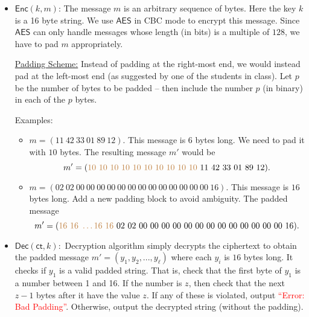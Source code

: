 \documentclass[11pt]{article}
\newcommand{\AES}{\mathsf{AES}}
\newcommand{\enc}{\mathsf{Enc}}
\newcommand{\dec}{\mathsf{Dec}}
\newcommand{\ct}{\mathsf{ct}}
\begin{document}
            \begin{itemize}
                \item $\enc(k, m)$: The message $m$ is an arbitrary sequence of bytes. Here the key $k$ is a 16 byte string. We use $\AES$ in CBC mode to encrypt this message. Since $\AES$ can only handle messages whose length (in bits) is a multiple of $128$, we have to pad $m$ appropriately. 

                \vspace{5pt}

                \underline{Padding Scheme:} Instead of padding at the right-most end, we would instead pad at the left-most end (as suggested by one of the students in class). Let $p$ be the number of bytes to be padded -- then include the number $p$ (in binary) in each of the $p$ bytes.

                \vspace{5pt}
                Examples:
                \begin{itemize}
                    \item $m = (11~ 42~ 33~ 01~ 89~ 12)$. This message is $6$ bytes long. We need to pad it with $10$ bytes. The resulting message $m'$ would be $$m' = (\textcolor{brown}{10 ~10~ 10~ 10~ 10~ 10~ 10~ 10~ 10~ 10}~ 11~ 42~ 33~ 01~ 89~ 12).$$

                    \item $m = (02 ~ 02~ 00~ 00~ 00~ 00~ 00~ 00~ 00~ 00~ 00~ 00~ 00~ 00~ 00~ 16)$. This message is $16$ bytes long. Add a new padding block to avoid ambiguity. The padded message $$m' = (\textcolor{brown}{16~ 16~ \ldots  16~ 16} ~ 02~ 02~ 00~ 00~ 00~ 00~ 00~ 00~ 00~ 00~ 00~ 00~ 00~ 00~ 00~ 16).$$
                \end{itemize}




                \item $\dec(\ct, k):$ Decryption algorithm simply decrypts the ciphertext to obtain the padded message $m' = (y_1, y_2, ..., y_{\ell})$ where each $y_{i}$ is $16$ bytes long. It checks if $y_1$ is a valid padded string. That is, check that the first byte of $y_1$ is a number between 1 and 16. If the number is $z$, then check that the next $z-1$ bytes after it have the value $z$. If any of these is violated, output \textcolor{red}{``Error: Bad Padding''}. Otherwise, output the decrypted string (without the padding). 

            \end{itemize}
\end{document}
